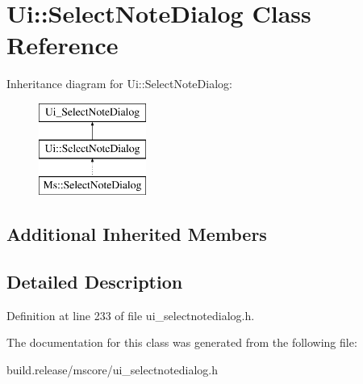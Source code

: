 \hypertarget{class_ui_1_1_select_note_dialog}{}\section{Ui\+:\+:Select\+Note\+Dialog Class Reference}
\label{class_ui_1_1_select_note_dialog}
Inheritance diagram for Ui\+:\+:Select\+Note\+Dialog\+:\begin{figure}[H]
\begin{center}
\leavevmode
\includegraphics[height=3.000000cm]{class_ui_1_1_select_note_dialog}
\end{center}
\end{figure}
\subsection*{Additional Inherited Members}


\subsection{Detailed Description}


Definition at line 233 of file ui\+\_\+selectnotedialog.\+h.



The documentation for this class was generated from the following file\+:\begin{DoxyCompactItemize}
\item 
build.\+release/mscore/ui\+\_\+selectnotedialog.\+h\end{DoxyCompactItemize}
